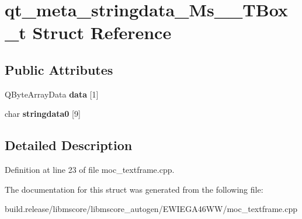 \hypertarget{structqt__meta__stringdata___ms_____t_box__t}{}\section{qt\+\_\+meta\+\_\+stringdata\+\_\+\+Ms\+\_\+\+\_\+\+T\+Box\+\_\+t Struct Reference}
\label{structqt__meta__stringdata___ms_____t_box__t}
\subsection*{Public Attributes}
\begin{DoxyCompactItemize}
\item 
\mbox{\label{structqt__meta__stringdata___ms_____t_box__t_abd449c9bf547d7c16d49788958713a23}} 
Q\+Byte\+Array\+Data {\bfseries data} \mbox{[}1\mbox{]}
\item 
\mbox{\label{structqt__meta__stringdata___ms_____t_box__t_a572329efc2875b76bf85b8ff7d7bc290}} 
char {\bfseries stringdata0} \mbox{[}9\mbox{]}
\end{DoxyCompactItemize}


\subsection{Detailed Description}


Definition at line 23 of file moc\+\_\+textframe.\+cpp.



The documentation for this struct was generated from the following file\+:\begin{DoxyCompactItemize}
\item 
build.\+release/libmscore/libmscore\+\_\+autogen/\+E\+W\+I\+E\+G\+A46\+W\+W/moc\+\_\+textframe.\+cpp\end{DoxyCompactItemize}
